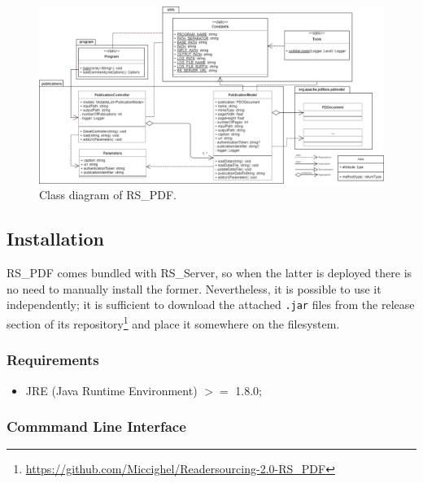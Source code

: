 \documentclass[a4paper, english]{article}
\begin{document}
\begin{figure}[!tbp]
\centering
\includegraphics[scale=0.55, angle=90]{figures/classi-2.png}
\caption{Class diagram of RS\_PDF.}
\label{fig:classi-2}
\end{figure}

\subsection{Installation}

RS\_PDF comes bundled with RS\_Server, so when the latter is deployed there is no need to manually install the former. Nevertheless, it is possible to use it independently; it is sufficient to download the attached \verb|.jar| files from the release section of its repository\footnote{\url{https://github.com/Miccighel/Readersourcing-2.0-RS_PDF}} and place it somewhere on the filesystem.

\subsubsection{Requirements}

\begin{itemize}
\item JRE (Java Runtime Environment) $>=$ 1.8.0;
\end{itemize}

\subsubsection{Commmand Line Interface}
\end{document}
